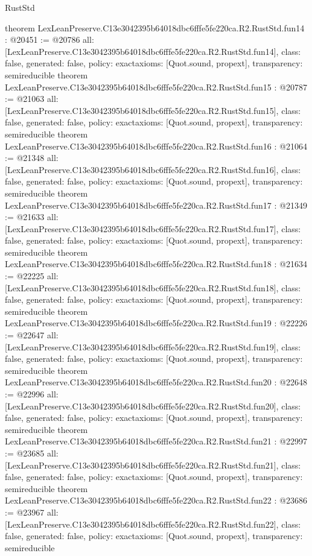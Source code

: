 \begin{lexlean}{RustStd}
\begin{coremodule}
{}
theorem LexLeanPreserve.C13e3042395b64018dbc6fffe5fe220ca.R2.RustStd.fun14 : @20451 := @20786 {
  all: [LexLeanPreserve.C13e3042395b64018dbc6fffe5fe220ca.R2.RustStd.fun14],
  class: false,
  generated: false,
  policy: exact{axioms: [Quot.sound, propext]},
  transparency: semireducible
}
theorem LexLeanPreserve.C13e3042395b64018dbc6fffe5fe220ca.R2.RustStd.fun15 : @20787 := @21063 {
  all: [LexLeanPreserve.C13e3042395b64018dbc6fffe5fe220ca.R2.RustStd.fun15],
  class: false,
  generated: false,
  policy: exact{axioms: [Quot.sound, propext]},
  transparency: semireducible
}
theorem LexLeanPreserve.C13e3042395b64018dbc6fffe5fe220ca.R2.RustStd.fun16 : @21064 := @21348 {
  all: [LexLeanPreserve.C13e3042395b64018dbc6fffe5fe220ca.R2.RustStd.fun16],
  class: false,
  generated: false,
  policy: exact{axioms: [Quot.sound, propext]},
  transparency: semireducible
}
theorem LexLeanPreserve.C13e3042395b64018dbc6fffe5fe220ca.R2.RustStd.fun17 : @21349 := @21633 {
  all: [LexLeanPreserve.C13e3042395b64018dbc6fffe5fe220ca.R2.RustStd.fun17],
  class: false,
  generated: false,
  policy: exact{axioms: [Quot.sound, propext]},
  transparency: semireducible
}
theorem LexLeanPreserve.C13e3042395b64018dbc6fffe5fe220ca.R2.RustStd.fun18 : @21634 := @22225 {
  all: [LexLeanPreserve.C13e3042395b64018dbc6fffe5fe220ca.R2.RustStd.fun18],
  class: false,
  generated: false,
  policy: exact{axioms: [Quot.sound, propext]},
  transparency: semireducible
}
theorem LexLeanPreserve.C13e3042395b64018dbc6fffe5fe220ca.R2.RustStd.fun19 : @22226 := @22647 {
  all: [LexLeanPreserve.C13e3042395b64018dbc6fffe5fe220ca.R2.RustStd.fun19],
  class: false,
  generated: false,
  policy: exact{axioms: [Quot.sound, propext]},
  transparency: semireducible
}
theorem LexLeanPreserve.C13e3042395b64018dbc6fffe5fe220ca.R2.RustStd.fun20 : @22648 := @22996 {
  all: [LexLeanPreserve.C13e3042395b64018dbc6fffe5fe220ca.R2.RustStd.fun20],
  class: false,
  generated: false,
  policy: exact{axioms: [Quot.sound, propext]},
  transparency: semireducible
}
theorem LexLeanPreserve.C13e3042395b64018dbc6fffe5fe220ca.R2.RustStd.fun21 : @22997 := @23685 {
  all: [LexLeanPreserve.C13e3042395b64018dbc6fffe5fe220ca.R2.RustStd.fun21],
  class: false,
  generated: false,
  policy: exact{axioms: [Quot.sound, propext]},
  transparency: semireducible
}
theorem LexLeanPreserve.C13e3042395b64018dbc6fffe5fe220ca.R2.RustStd.fun22 : @23686 := @23967 {
  all: [LexLeanPreserve.C13e3042395b64018dbc6fffe5fe220ca.R2.RustStd.fun22],
  class: false,
  generated: false,
  policy: exact{axioms: [Quot.sound, propext]},
  transparency: semireducible
}
\end{coremodule}
\end{lexlean}
